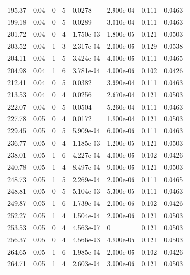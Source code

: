 \documentclass[preview]{standalone}
\begin{document}
{{{\begin{tabular}{L{1.2cm}C{1.2cm} C{0.3cm}C{0.5cm} C{1.4cm}C{1.4cm} C{1.4cm}C{1.4cm}}
  195.37  &  0.04  & 0     &  5 &  0.0278  & 2.900e-04  & 0.111 &  0.0463   \\ 
  199.18  &  0.04  & 0     &  5 &  0.0289  & 3.010e-04  & 0.111 &  0.0463   \\ 
  201.72  &  0.04  & 0     &  4 &  1.750e-03  & 1.800e-05  & 0.121 &  0.0503   \\ 
  203.52  &  0.04  & 1     &  3 &  2.317e-04  & 2.000e-06  & 0.129 &  0.0538   \\ 
  204.11  &  0.04  & 1     &  5 &  3.424e-04  & 4.000e-06  & 0.111 &  0.0465   \\ 
  204.98  &  0.04  & 1     &  6 &  3.781e-04  & 4.000e-06  & 0.102 &  0.0426   \\ 
  212.41  &  0.04  & 0     &  5 &  0.0382  & 3.990e-04  & 0.111 &  0.0463   \\ 
  213.53  &  0.04  & 0     &  4 &  0.0256  & 2.670e-04  & 0.121 &  0.0503   \\ 
  222.07  &  0.04  & 0     &  5 &  0.0504  & 5.260e-04  & 0.111 &  0.0463   \\ 
  227.78  &  0.05  & 0     &  4 &  0.0172  & 1.800e-04  & 0.121 &  0.0503   \\ 
  229.45  &  0.05  & 0     &  5 &  5.909e-04  & 6.000e-06  & 0.111 &  0.0463   \\ 
  236.77  &  0.05  & 0     &  4 &  1.185e-03  & 1.200e-05  & 0.121 &  0.0503   \\ 
  238.01  &  0.05  & 1     &  6 &  4.227e-04  & 4.000e-06  & 0.102 &  0.0426   \\ 
  240.78  &  0.05  & 1     &  4 &  8.497e-04  & 9.000e-06  & 0.121 &  0.0503   \\ 
  248.73  &  0.05  & 1     &  5 &  2.269e-04  & 2.000e-06  & 0.111 &  0.0465   \\ 
  248.81  &  0.05  & 0     &  5 &  5.104e-03  & 5.300e-05  & 0.111 &  0.0463   \\ 
  249.87  &  0.05  & 1     &  6 &  1.739e-04  & 2.000e-06  & 0.102 &  0.0426   \\ 
  252.27  &  0.05  & 1     &  4 &  1.504e-04  & 2.000e-06  & 0.121 &  0.0503   \\ 
  253.53  &  0.05  & 0     &  4 &  4.563e-07  & 0  & 0.121 &  0.0503   \\ 
  256.37  &  0.05  & 0     &  4 &  4.566e-03  & 4.800e-05  & 0.121 &  0.0503   \\ 
  264.65  &  0.05  & 1     &  6 &  1.985e-04  & 2.000e-06  & 0.102 &  0.0426   \\ 
  264.71  &  0.05  & 1     &  4 &  2.603e-04  & 3.000e-06  & 0.121 &  0.0503   \\ 

\end{tabular}}}}
\end{document}

